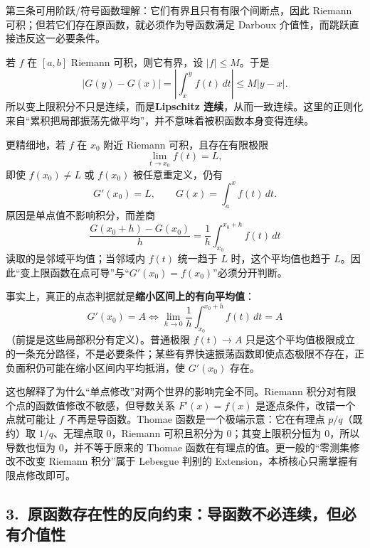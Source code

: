 \documentclass[UTF8,a4paper,10pt]{ctexart}
\begin{document}
第三条可用阶跃/符号函数理解：它们有界且只有有限个间断点，因此 Riemann 可积；但若它们存在原函数，就必须作为导函数满足 Darboux 介值性，而跳跃直接违反这一必要条件。

若 $f$ 在 $[a,b]$ Riemann 可积，则它有界，设 $\lvert f\rvert\le M$。于是
\[
\lvert G(y)-G(x)\rvert
=\left\lvert\int_x^y f(t)\,dt\right\rvert
\le M\lvert y-x\rvert.
\]
所以变上限积分不只是连续，而是\textbf{Lipschitz 连续}，从而一致连续。这里的正则化来自“累积把局部振荡先做平均”，并不意味着被积函数本身变得连续。

更精细地，若 $f$ 在 $x_0$ 附近 Riemann 可积，且存在有限极限
\[
\lim_{t\to x_0}f(t)=L,
\]
即使 $f(x_0)\ne L$ 或 $f(x_0)$ 被任意重定义，仍有
\[
G'(x_0)=L,
\qquad G(x)=\int_a^x f(t)\,dt.
\]
原因是单点值不影响积分，而差商
\[
\frac{G(x_0+h)-G(x_0)}{h}
=\frac1h\int_{x_0}^{x_0+h}f(t)\,dt
\]
读取的是邻域平均值；当邻域内 $f(t)$ 统一趋于 $L$ 时，这个平均值也趋于 $L$。因此“变上限函数在点可导”与“$G'(x_0)=f(x_0)$”必须分开判断。

事实上，真正的点态判据就是\textbf{缩小区间上的有向平均值}：
\[
\boxed{
G'(x_0)=A
\iff
\lim_{h\to0}\frac1h\int_{x_0}^{x_0+h}f(t)\,dt=A
}
\]
（前提是这些局部积分有定义）。普通极限 $f(t)\to A$ 只是这个平均值极限成立的一条充分路径，不是必要条件；某些有界快速振荡函数即使点态极限不存在，正负面积仍可能在缩小区间内平均抵消，使 $G'(x_0)$ 存在。

\begin{center}

\end{center}

这也解释了为什么“单点修改”对两个世界的影响完全不同。Riemann 积分对有限个点的函数值修改不敏感，但导数关系 $F'(x)=f(x)$ 是逐点条件，改错一个点就可能让 $f$ 不再是导函数。Thomae 函数是一个极端示意：它在有理点 $p/q$（既约）取 $1/q$、无理点取 $0$，Riemann 可积且积分为 $0$；其变上限积分恒为 $0$，所以导数也恒为 $0$，并不等于原来的 Thomae 函数在有理点的值。更一般的“零测集修改不改变 Riemann 积分”属于 Lebesgue 判别的 Extension，本桥核心只需掌握有限点修改即可。

\subsection*{3.\ 原函数存在性的反向约束：导函数不必连续，但必有介值性}
\end{document}
